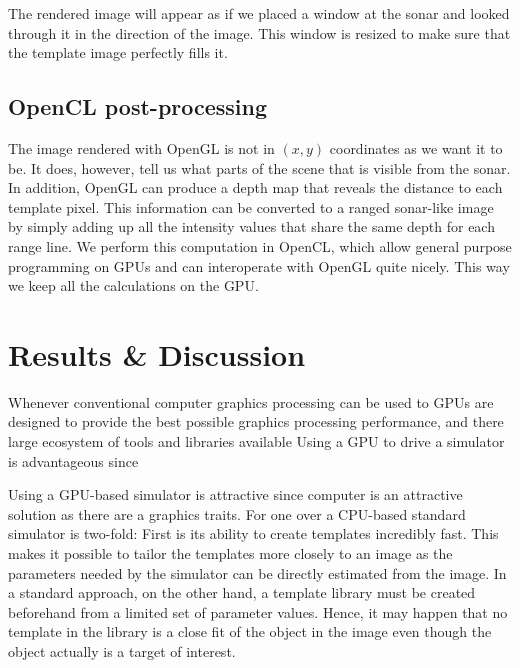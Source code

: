 \documentclass[
   UAM                                          %
 , 12pt                                         %
 , bibtex                                       %
 , layout
]{common/mytemplate}
\begin{document}
The rendered image will appear as if we placed a window at the sonar and looked through it in the direction of the image. This window is resized to make sure that the template image perfectly fills it.

\subsection{OpenCL post-processing}

The image rendered with OpenGL is not in $(x,y)$ coordinates as we want it to be. It does, however, tell us what parts of the scene that is visible from the sonar. In addition, OpenGL can produce a depth map that reveals the distance to each template pixel. This information can be converted to a ranged sonar-like image by simply adding up all the intensity values that share the same depth for each range line. We perform this computation in OpenCL, which allow general purpose programming on GPUs and can interoperate with OpenGL quite nicely. This way we keep all the calculations on the GPU.



\section{Results \& Discussion}

\newlength\imgspacing\setlength\imgspacing{.5cm}

Whenever conventional computer graphics processing can be used to 
GPUs are designed to provide the best possible graphics processing performance, and there large ecosystem of tools and libraries  available 
Using a GPU to drive a simulator is advantageous since


Using a GPU-based simulator is attractive since computer is an attractive solution as there are a  graphics traits. For one over a CPU-based standard simulator is two-fold: First is its ability to create templates incredibly fast. This makes it possible to tailor the templates more closely to an image as the parameters needed by the simulator can be directly estimated from the image. In a standard approach, on the other hand, a template library must be created beforehand from a limited set of parameter values. Hence, it may happen that no template in the library is a close fit of the object in the image even though the object actually is a target of interest.
\end{document}

